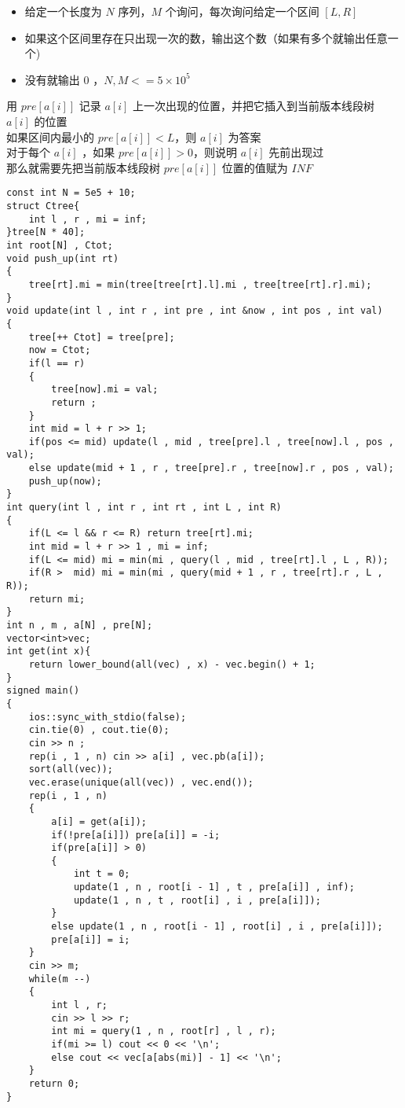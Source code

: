 \documentclass[E:/GsjzTle/main/main.tex]{subfiles}
\begin{document}
\begin{itemize}
\item
  给定一个长度为 \(N\) 序列，\(M\) 个询问，每次询问给定一个区间
  \([L,R]\)
\item
  如果这个区间里存在只出现一次的数，输出这个数（如果有多个就输出任意一个)
\item
  没有就输出 \(0\) ，\(N,M<=5\times10^5\)
\end{itemize}

用 \(pre[a[i]]\) 记录 \(a[i]\)
上一次出现的位置，并把它插入到当前版本线段树 \(a[i]\) 的位置\\
如果区间内最小的 \(pre[a[i]] < L\)，则 \(a[i]\) 为答案\\
对于每个 \(a[i]\) ，如果 \(pre[a[i]]>0\)，则说明 \(a[i]\) 先前出现过\\
那么就需要先把当前版本线段树 \(pre[a[i]]\) 位置的值赋为 \(INF\)

\begin{lstlisting}
const int N = 5e5 + 10;
struct Ctree{
	int l , r , mi = inf;
}tree[N * 40];
int root[N] , Ctot;
void push_up(int rt)
{
	tree[rt].mi = min(tree[tree[rt].l].mi , tree[tree[rt].r].mi);
}
void update(int l , int r , int pre , int &now , int pos , int val)
{
	tree[++ Ctot] = tree[pre];
	now = Ctot;
	if(l == r)
	{
		tree[now].mi = val;
		return ;
	}
	int mid = l + r >> 1;
	if(pos <= mid) update(l , mid , tree[pre].l , tree[now].l , pos , val);
	else update(mid + 1 , r , tree[pre].r , tree[now].r , pos , val);
	push_up(now);
}
int query(int l , int r , int rt , int L , int R)
{
	if(L <= l && r <= R) return tree[rt].mi;
	int mid = l + r >> 1 , mi = inf;
	if(L <= mid) mi = min(mi , query(l , mid , tree[rt].l , L , R));
	if(R >  mid) mi = min(mi , query(mid + 1 , r , tree[rt].r , L , R));
	return mi; 
}
int n , m , a[N] , pre[N];
vector<int>vec;
int get(int x){
	return lower_bound(all(vec) , x) - vec.begin() + 1;
}
signed main()
{
	ios::sync_with_stdio(false);
	cin.tie(0) , cout.tie(0);
	cin >> n ;
	rep(i , 1 , n) cin >> a[i] , vec.pb(a[i]);
	sort(all(vec));
	vec.erase(unique(all(vec)) , vec.end());
	rep(i , 1 , n) 
	{
		a[i] = get(a[i]);
		if(!pre[a[i]]) pre[a[i]] = -i; 
		if(pre[a[i]] > 0) 
		{
			int t = 0;
			update(1 , n , root[i - 1] , t , pre[a[i]] , inf);
			update(1 , n , t , root[i] , i , pre[a[i]]);
		}
		else update(1 , n , root[i - 1] , root[i] , i , pre[a[i]]);
		pre[a[i]] = i; 
	}
	cin >> m;
	while(m --)
	{
		int l , r;
		cin >> l >> r;
		int mi = query(1 , n , root[r] , l , r);
		if(mi >= l) cout << 0 << '\n';
		else cout << vec[a[abs(mi)] - 1] << '\n';
	}
	return 0;
}
\end{lstlisting}
\end{document}
